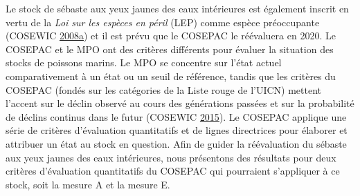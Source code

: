 \documentclass[11pt]{book}
\begin{document}
\clearpage

\label{app:cosewic}

Le stock de sébaste aux yeux jaunes des eaux intérieures est également inscrit en vertu de la \emph{Loi sur les espèces en péril} (LEP) comme espèce préoccupante (COSEWIC \protect\hyperlink{ref-cosewic2008}{2008}\protect\hyperlink{ref-cosewic2008}{a}) et il est prévu que le COSEPAC le réévaluera en 2020. Le COSEPAC et le MPO ont des critères différents pour évaluer la situation des stocks de poissons marins. Le MPO se concentre sur l'état actuel comparativement à un état ou un seuil de référence, tandis que les critères du COSEPAC (fondés sur les catégories de la Liste rouge de l'UICN) mettent l'accent sur le déclin observé au cours des générations passées et sur la probabilité de déclins continus dans le futur (COSEWIC \protect\hyperlink{ref-cosewic2015}{2015}). Le COSEPAC applique une série de critères d'évaluation quantitatifs et de lignes directrices pour élaborer et attribuer un état au stock en question. Afin de guider la réévaluation du sébaste aux yeux jaunes des eaux intérieures, nous présentons des résultats pour deux critères d'évaluation quantitatifs du COSEPAC qui pourraient s'appliquer à ce stock, soit la mesure A et la mesure E.

\hypertarget{mesure-a-du-cosepac}{%
\label{mesure-a-du-cosepac}}
\end{document}
